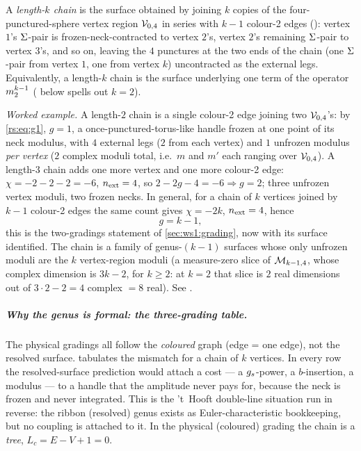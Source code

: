 \begin{definition}
	\label{rs:def:chain}
	A \emph{length-$k$ chain} is the surface obtained by joining $k$ copies of the
	four-punctured-sphere vertex region ${\mathcal{V}}_{0,4}$ in series with $k-1$
	colour-2 edges (): vertex $1$'s $\Sigma$-pair is
	frozen-neck-contracted to vertex $2$'s, vertex $2$'s remaining $\Sigma$-pair to
	vertex $3$'s, and so on, leaving the $4$ punctures at the two ends of the chain
	(one $\Sigma$-pair from vertex $1$, one from vertex $k$) uncontracted as the
	external legs. Equivalently, a length-$k$ chain is the surface underlying one
	term of the operator $m_2^{k-1}$ ( below spells out
	$k=2$).
\end{definition}
\emph{Worked example.} A length-$2$ chain is a single colour-2 edge joining two
${\mathcal{V}}_{0,4}$'s: by \eqref{rs:eq:g1}, $g=1$, a once-punctured-torus-like handle
frozen at one point of its neck modulus, with $4$ external legs ($2$ from each
vertex) and $1$ unfrozen modulus \emph{per vertex} ($2$ complex moduli total,
i.e.\ $m$ and $m'$ each ranging over ${\mathcal{V}}_{0,4}$). A length-$3$ chain adds one
more vertex and one more colour-2 edge: $\chi=-2-2-2=-6$, $n_{\rm ext}=4$, so
$2-2g-4=-6\Rightarrow g=2$; three unfrozen vertex moduli, two frozen necks. In
general, for a chain of $k$ vertices joined by $k-1$ colour-2 edges the same
count gives $\chi=-2k$, $n_{\rm ext}=4$, hence
\begin{equation}
	g=k-1,
	\label{rs:eq:chaingenus}
\end{equation}
this is the two-gradings statement of \cref{sec:ws1:grading}, now with its surface identified. The
chain is a family of genus-$(k-1)$ surfaces whose only unfrozen moduli are the
$k$ vertex-region moduli (a measure-zero slice of ${\mathcal{M}}_{k-1,4}$, whose complex
dimension is $3k-2$, for $k\ge2$: at $k=2$ that slice is $2$ real dimensions out
of $3\cdot2-2=4$ complex $=8$ real). See .

\subparagraph{Why the genus is formal: the three-grading table.} The physical
gradings all follow the \emph{coloured} graph (edge = one edge), not the resolved
surface.  tabulates the mismatch for a chain of $k$ vertices. In
every row the resolved-surface prediction would attach a cost --- a $g_s$-power, a
$b$-insertion, a modulus --- to a handle that the amplitude never pays for,
because the neck is frozen and never integrated. This is the 't~Hooft double-line
situation \cite{tHooft1974} run in reverse: the ribbon (resolved) genus exists as
Euler-characteristic bookkeeping, but no coupling is attached to it. In the
physical (coloured) grading the chain is a \emph{tree}, $L_c=E-V+1=0$.

